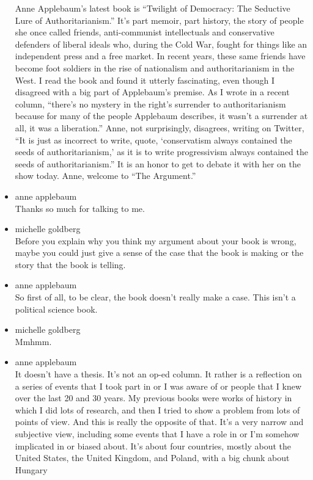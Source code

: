 \begin{itemize}
  Anne Applebaum's latest book is ``Twilight of Democracy: The Seductive
  Lure of Authoritarianism.'' It's part memoir, part history, the story
  of people she once called friends, anti-communist intellectuals and
  conservative defenders of liberal ideals who, during the Cold War,
  fought for things like an independent press and a free market. In
  recent years, these same friends have become foot soldiers in the rise
  of nationalism and authoritarianism in the West. I read the book and
  found it utterly fascinating, even though I disagreed with a big part
  of Applebaum's premise. As I wrote in a recent column, ``there's no
  mystery in the right's surrender to authoritarianism because for many
  of the people Applebaum describes, it wasn't a surrender at all, it
  was a liberation.'' Anne, not surprisingly, disagrees, writing on
  Twitter, ``It is just as incorrect to write, quote, `conservatism
  always contained the seeds of authoritarianism,' as it is to write
  progressivism always contained the seeds of authoritarianism.'' It is
  an honor to get to debate it with her on the show today. Anne, welcome
  to ``The Argument.''
\item
  anne applebaum\\
  Thanks so much for talking to me.
\item
  michelle goldberg\\
  Before you explain why you think my argument about your book is wrong,
  maybe you could just give a sense of the case that the book is making
  or the story that the book is telling.
\item
  anne applebaum\\
  So first of all, to be clear, the book doesn't really make a case.
  This isn't a political science book.
\item
  michelle goldberg\\
  Mmhmm.
\item
  anne applebaum\\
  It doesn't have a thesis. It's not an op-ed column. It rather is a
  reflection on a series of events that I took part in or I was aware of
  or people that I knew over the last 20 and 30 years. My previous books
  were works of history in which I did lots of research, and then I
  tried to show a problem from lots of points of view. And this is
  really the opposite of that. It's a very narrow and subjective view,
  including some events that I have a role in or I'm somehow implicated
  in or biased about. It's about four countries, mostly about the United
  States, the United Kingdom, and Poland, with a big chunk about Hungary

\end{itemize}
